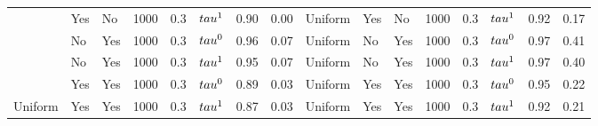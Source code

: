 \begin{tabular}[t]{lllrrlrrlllrrlrr}
 & Yes & No & 1000 & 0.3 & $\\tau^1$ & 0.90 & 0.00 & Uniform & Yes & No & 1000 & 0.3 & $\\tau^1$ & 0.92 & 0.17\\

 & No & Yes & 1000 & 0.3 & $\\tau^0$ & 0.96 & 0.07 & Uniform & No & Yes & 1000 & 0.3 & $\\tau^0$ & 0.97 & 0.41\\

 & No & Yes & 1000 & 0.3 & $\\tau^1$ & 0.95 & 0.07 & Uniform & No & Yes & 1000 & 0.3 & $\\tau^1$ & 0.97 & 0.40\\

 & Yes & Yes & 1000 & 0.3 & $\\tau^0$ & 0.89 & 0.03 & Uniform & Yes & Yes & 1000 & 0.3 & $\\tau^0$ & 0.95 & 0.22\\

\multirow{-8}{*}{\raggedright\arraybackslash Uniform} & Yes & Yes & 1000 & 0.3 & $\\tau^1$ & 0.87 & 0.03 & Uniform & Yes & Yes & 1000 & 0.3 & $\\tau^1$ & 0.92 & 0.21\\
\bottomrule
\end{tabular}
